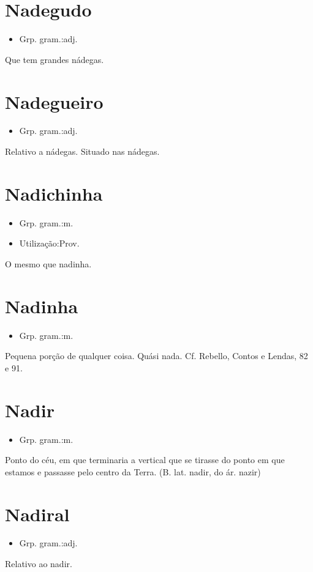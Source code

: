 \section{Nadegudo}
\begin{itemize}
\item {Grp. gram.:adj.}
\end{itemize}
Que tem grandes nádegas.
\section{Nadegueiro}
\begin{itemize}
\item {Grp. gram.:adj.}
\end{itemize}
Relativo a nádegas.
Situado nas nádegas.
\section{Nadichinha}
\begin{itemize}
\item {Grp. gram.:m.}
\end{itemize}
\begin{itemize}
\item {Utilização:Prov.}
\end{itemize}
O mesmo que \textunderscore nadinha\textunderscore .
\section{Nadinha}
\begin{itemize}
\item {Grp. gram.:m.}
\end{itemize}
Pequena porção de qualquer coisa.
Quási nada. Cf. Rebello, \textunderscore Contos e Lendas\textunderscore , 82 e 91.
\section{Nadir}
\begin{itemize}
\item {Grp. gram.:m.}
\end{itemize}
Ponto do céu, em que terminaria a vertical que se tirasse do ponto em que estamos e passasse pelo centro da Terra.
(B. lat. \textunderscore nadir\textunderscore , do ár. \textunderscore nazir\textunderscore )
\section{Nadiral}
\begin{itemize}
\item {Grp. gram.:adj.}
\end{itemize}
Relativo ao nadir.
